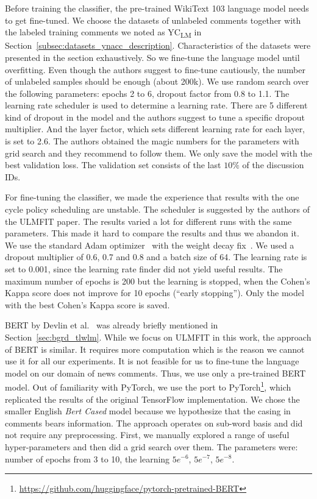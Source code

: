 Before training the classifier, the pre-trained WikiText 103 language model needs to get fine-tuned. We choose the datasets of unlabeled comments together with the labeled training comments we noted as YC\textsubscript{LM} in Section~\ref{subsec:datasets_ynacc_description}. Characteristics of the datasets were presented in the section exhaustively. So we fine-tune the language model until overfitting. Even though the authors suggest to fine-tune cautiously, the number of unlabeled samples should be enough (about 200k).
We use random search over the following parameters: epochs 2 to 6, dropout factor from 0.8 to 1.1.
The learning rate scheduler is used to determine a learning rate.
There are 5 different kind of dropout in the model and the authors suggest to tune a specific dropout multiplier.
 And the layer factor, which sets different learning rate for each layer, is set to 2.6.
The authors obtained the magic numbers for the parameters with grid search and they recommend to follow them.
We only save the model with the best validation loss.
The validation set consists of the last $10\%$ of the discussion IDs.

For fine-tuning the classifier, we made the experience that results with the one cycle policy scheduling are unstable. The scheduler is suggested by the authors of the ULMFIT paper. The results varied a lot for different runs with the same parameters. This made it hard to compare the results and thus we abandon it. We use the standard Adam optimizer~\cite{kingma:adam} with the weight decay fix~\cite{loshchilov2017decoupled}.
We used a dropout multiplier of 0.6, 0.7 and 0.8 and a batch size of 64.
The learning rate is set to 0.001, since the learning rate finder did not yield useful results.
The maximum number of epochs is 200 but the learning is stopped, when the Cohen's Kappa score does not improve for 10 epochs (``early stopping''). Only the model with the best Cohen's Kappa score is saved. 

BERT by Devlin et al.~\cite{devlin2018bert} was already briefly mentioned in Section~\ref{sec:bgrd_tlwlm}. While we focus on ULMFIT in this work, the approach of BERT is similar. It requires more computation which is the reason we cannot use it for all our experiments. It is not feasible for us to fine-tune the language model on our domain of news comments. Thus, we use only a pre-trained BERT model. Out of familiarity with PyTorch, we use the port to PyTorch\footnote{\url{https://github.com/huggingface/pytorch-pretrained-BERT}}, which replicated the results of the original TensorFlow implementation. We chose the smaller English \textit{Bert Cased} model because we hypothesize that the casing in comments bears information. The approach operates on sub-word basis and did not require any preprocessing. First, we manually explored a range of useful hyper-parameters and then did a grid search over them. The parameters were: number of epochs from 3 to 10, the learning $5e^{-6}$, $5e^{-7}$, $5e^{-8}$.

